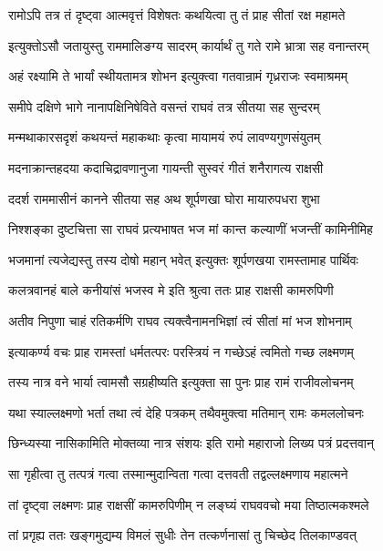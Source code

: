 \twolineshloka
{रामोऽपि तत्र तं दृष्ट्वा आत्मवृत्तं विशेषतः}
{कथयित्वा तु तं प्राह सीतां रक्ष महामते} %

\twolineshloka
{इत्युक्तोऽसौ जतायुस्तु राममालिङग्य सादरम्}
{कार्यार्थं तु गते रामे भ्रात्रा सह वनान्तरम्} %

\twolineshloka
{अहं रक्ष्यामि ते भार्यां स्थीयतामत्र शोभन}
{इत्युक्त्वा गतवान्रामं गृध्रराजः स्वमाश्रमम्} %

\twolineshloka
{समीपे दक्षिणे भागे नानापक्षिनिषेविते}
{वसन्तं राघवं तत्र सीतया सह सुन्दरम्} %

\twolineshloka
{मन्मथाकारसदृशं कथयन्तं महाकथाः}
{कृत्वा मायामयं रुपं लावण्यगुणसंयुतम्} %

\twolineshloka
{मदनाक्रान्तहदया कदाचिद्रावणानुजा}
{गायन्ती सुस्वरं गीतं शनैरागत्य राक्षसी} %

\twolineshloka
{ददर्श राममासीनं कानने सीतया सह}
{अथ शूर्पणखा घोरा मायारुपधरा शुभा} %

\twolineshloka
{निश्शङ्का दुष्टचित्ता सा राघवं प्रत्यभाषत}
{भज मां कान्त कल्याणीं भजन्तीं कामिनीमिह} %

\twolineshloka
{भजमानां त्यजेद्यस्तु तस्य दोषो महान् भवेत्}
{इत्युक्तः शूर्पणखया रामस्तामाह पार्थिवः} %

\twolineshloka
{कलत्रवानहं बाले कनीयांसं भजस्व मे}
{इति श्रुत्वा ततः प्राह राक्षसी कामरुपिणी} %

\twolineshloka
{अतीव निपुणा चाहं रतिकर्मणि राघव}
{त्यक्त्वैनामनभिज्ञां त्वं सीतां मां भज शोभनाम्} %

\twolineshloka
{इत्याकर्ण्य वचः प्राह रामस्तां धर्मतत्परः}
{परस्त्रियं न गच्छेऽहं त्वमितो गच्छ लक्ष्मणम्} %

\twolineshloka
{तस्य नात्र वने भार्या त्वामसौ सग्रहीष्यति}
{इत्युक्ता सा पुनः प्राह रामं राजीवलोचनम्} %

\twolineshloka
{यथा स्याल्लक्ष्मणो भर्ता तथा त्वं देहि पत्रकम्}
{तथैवमुक्त्वा मतिमान् रामः कमललोचनः} %

\twolineshloka
{छिन्ध्यस्या नासिकामिति मोक्तव्या नात्र संशयः}
{इति रामो महाराजो लिख्य पत्रं प्रदत्तवान्} %

\twolineshloka
{सा गृहीत्वा तु तत्पत्रं गत्वा तस्मान्मुदान्विता}
{गत्वा दत्तवती तद्वल्लक्ष्मणाय महात्मने} %

\twolineshloka
{तां दृष्ट्वा लक्ष्मणः प्राह राक्षसीं कामरुपिणीम्}
{न लङ्घ्यं राघववचो मया तिष्ठात्मकश्मले} %

\twolineshloka
{तां प्रगृह्य ततः खङ्गमुद्यम्य विमलं सुधीः}
{तेन तत्कर्णनासां तु चिच्छेद तिलकाण्डवत्} %

